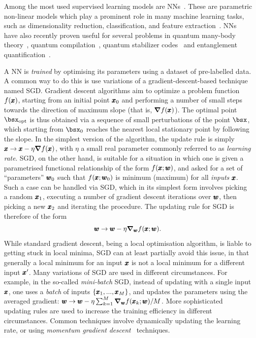 Among the most used supervised learning models are \acp{NN}~\cite{hechtnielsen1989theory,haykin1998neural}.
These are parametric non-linear models which play a prominent role in many machine learning tasks, such as dimensionality reduction, classification, and feature extraction~\cite{hechtnielsen1989theory,haykin1998neural}.
\acp{NN} have also recently proven useful for several problems in quantum many-body theory~\cite{amin2016quantum,wang2016discovering,hush2017machine,carleo2017solving,carrasquilla2017machine,torlai2017manybody,broecker2017quantum,deng2017quantum},
quantum compilation~\cite{swaddle2017generating}, quantum stabilizer codes~\cite{krastanov2017deep} and entanglement quantification~\cite{gray2017measuring}.

A \ac{NN} is \emph{trained} by optimising its parameters using a dataset of pre-labelled data.
A common  way to do this is use variations of a gradient-descent-based technique named \ac{SGD}.
Gradient descent algorithms aim to optimize a problem function $f(\pmb{x})$, starting from an initial point $\pmb{x}_0$ and performing a number of small steps towards the direction of maximum slope (that is, $\grad f(\pmb{x})$).
The optimal point $\bsx_{\on{opt}}$ is thus obtained via a sequence of small perturbations of the point $\bsx$, which starting from $\bsx_0$ reaches the nearest local stationary point by following the slope.
In the simplest version of the algorithm, the update rule is simply $\pmb{x} \to \pmb{x} - \eta \grad f(\pmb{x})$, with $\eta$ a small real parameter commonly referred to as \emph{learning rate}.
\ac{SGD}, on the other hand, is suitable for a situation in which one is given a parametrised functional relationship of the form $f(\pmb{x}; \pmb{w})$, and asked for a set of ``parameters'' $\pmb{w}_0$ such that $f(\pmb{x}; \pmb{w}_0)$ is minimum (maximum) for all \emph{inputs} $\pmb{x}$.
Such a case can be handled via \ac{SGD}, which in its simplest form involves picking a random $\pmb{x}_1$, executing a number of gradient descent iterations over $\pmb{w}$, then picking a new $\pmb{x}_2$ and iterating the procedure.
The updating rule for \ac{SGD} is therefore of the form
\begin{equation}
	\pmb{w} \to \pmb{w} - \eta\grad_{\pmb{w}}f(\pmb{x};\pmb{w}).
	\label{eq:updating_rule}
\end{equation}
While standard gradient descent, being a local optimisation algorithm, is liable to getting stuck in local minima, \ac{SGD} can at least partially avoid this issue, in that generally a local minimum for an input $\pmb{x}$ is not a local minimum for a different input $\pmb{x}'$.
Many variations of \ac{SGD} are used in different circumstances.
For example, in the so-called \emph{mini-batch} \ac{SGD}, instead of updating with a single input $\pmb{x}$, one uses a \emph{batch} of inputs $\{\pmb{x}_1,...,\pmb{x}_M\}$, and updates the parameters using the averaged gradient:
$\pmb{w}\to\pmb{w}-\eta\sum_{k=1}^M\grad_{\pmb{w}}f(\pmb{x}_k; \pmb{w})/M$.
More sophisticated updating rules are used to increase the training efficiency in different circumstances.
Common techniques involve dynamically updating the learning rate, or using \emph{momentum gradient descent}~\cite{goh2017momentum,ruder2016overview} techniques.

